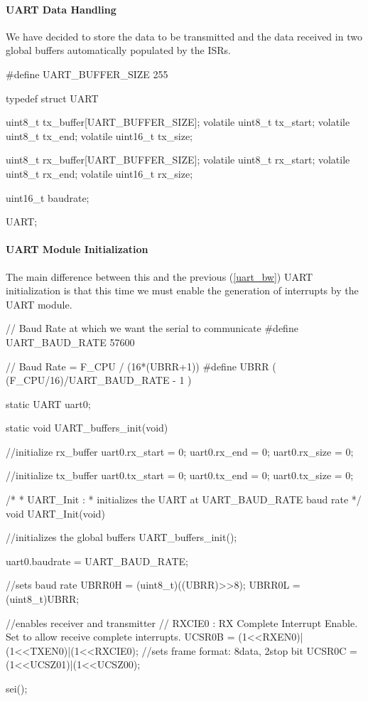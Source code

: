 \paragraph{UART Data Handling}
We have decided to store the data to be transmitted and the data received in two global buffers automatically populated by the ISRs.
\begin{ccode}
	#define UART_BUFFER_SIZE 255

	typedef struct UART {
		uint8_t tx_buffer[UART_BUFFER_SIZE];
		volatile uint8_t tx_start;
		volatile uint8_t tx_end;
		volatile uint16_t tx_size;

		uint8_t rx_buffer[UART_BUFFER_SIZE];
		volatile uint8_t rx_start;
		volatile uint8_t rx_end;
		volatile uint16_t rx_size;
		
		uint16_t baudrate;
	} UART;
\end{ccode}

\paragraph{UART Module Initialization}
The main difference between this and the previous (\ref{uart_bw}) UART initialization is that this time we must enable the generation of interrupts by the UART module.
\begin{ccode}
	// Baud Rate at which we want the serial to communicate
	#define UART_BAUD_RATE 57600

	// Baud Rate = F_CPU / (16*(UBRR+1))
	#define UBRR ( (F_CPU/16)/UART_BAUD_RATE - 1 )
	
	static UART uart0;

	static void UART_buffers_init(void) {
		//initialize rx_buffer
		uart0.rx_start = 0;
		uart0.rx_end = 0;
		uart0.rx_size = 0;
	
		//initialize tx_buffer
		uart0.tx_start = 0;
		uart0.tx_end = 0;
		uart0.tx_size = 0;
	}

	/*
	 * UART_Init :
	 * 	initializes the UART at UART_BAUD_RATE baud rate
	 */
	void UART_Init(void){
		//initializes the global buffers
		UART_buffers_init();

		uart0.baudrate = UART_BAUD_RATE;
	
		//sets baud rate
		UBRR0H = (uint8_t)((UBRR)>>8);
		UBRR0L = (uint8_t)UBRR;
	
		//enables receiver and transmitter
			// RXCIE0 : RX Complete Interrupt Enable. Set to allow receive complete interrupts.
		UCSR0B = (1<<RXEN0)|(1<<TXEN0)|(1<<RXCIE0);
		//sets frame format: 8data, 2stop bit
		UCSR0C = (1<<UCSZ01)|(1<<UCSZ00);
	
		sei();
	}
\end{ccode}

